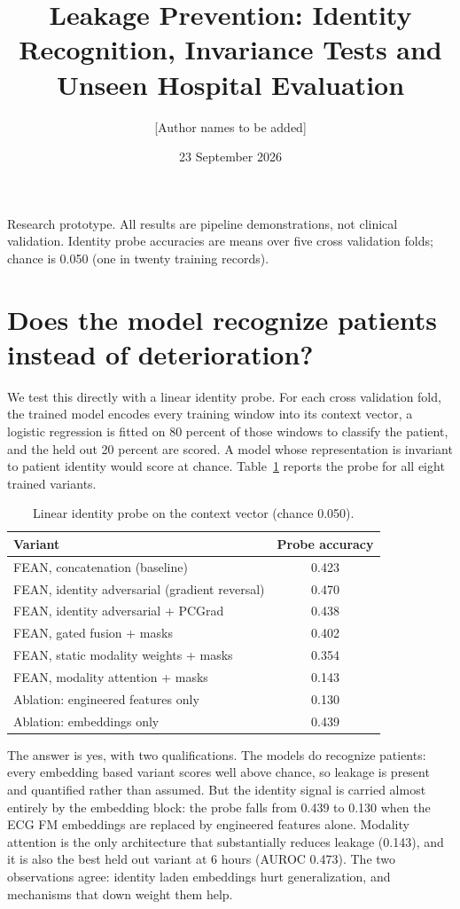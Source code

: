 \documentclass[11pt]{article}
\title{Leakage Prevention: Identity Recognition, Invariance Tests and
Unseen Hospital Evaluation}
\author{[Author names to be added]}
\date{23 September 2026}
\begin{document}
\maketitle

\begin{center}
\small
Research prototype. All results are pipeline demonstrations, not clinical
validation. Identity probe accuracies are means over five cross validation
folds; chance is 0.050 (one in twenty training records).
\end{center}

\section{Does the model recognize patients instead of deterioration?}
We test this directly with a linear identity probe. For each cross validation
fold, the trained model encodes every training window into its context vector,
a logistic regression is fitted on 80 percent of those windows to classify the
patient, and the held out 20 percent are scored. A model whose representation
is invariant to patient identity would score at chance. Table~\ref{tab:probe}
reports the probe for all eight trained variants.

\begin{table}[h]
\centering
\caption{Linear identity probe on the context vector (chance 0.050).}
\label{tab:probe}
\begin{tabular}{lc}
\toprule
Variant & Probe accuracy \\
\midrule
FEAN, concatenation (baseline) & 0.423 \\
FEAN, identity adversarial (gradient reversal) & 0.470 \\
FEAN, identity adversarial + PCGrad & 0.438 \\
FEAN, gated fusion + masks & 0.402 \\
FEAN, static modality weights + masks & 0.354 \\
FEAN, modality attention + masks & 0.143 \\
Ablation: engineered features only & 0.130 \\
Ablation: embeddings only & 0.439 \\
\bottomrule
\end{tabular}
\end{table}

The answer is yes, with two qualifications. The models do recognize patients:
every embedding based variant scores well above chance, so leakage is present
and quantified rather than assumed. But the identity signal is carried almost
entirely by the embedding block: the probe falls from 0.439 to 0.130 when the
ECG FM embeddings are replaced by engineered features alone. Modality
attention is the only architecture that substantially reduces leakage (0.143),
and it is also the best held out variant at 6 hours (AUROC 0.473). The two
observations agree: identity laden embeddings hurt generalization, and
mechanisms that down weight them help.
\end{document}
